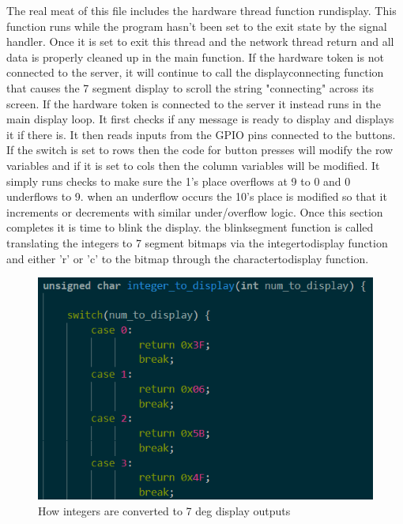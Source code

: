 \documentclass[a4paper,10pt]{article}
\begin{document}
The real meat of this file includes the hardware thread function run\textunderscore display. This function runs while the program hasn't been set to the exit state by the signal handler. Once it is set to exit this thread and the network thread return and all data is properly cleaned up in the main function. If the hardware token is not connected to the server, it will continue to call the display\textunderscore connecting function that causes the 7 segment display to scroll the string "connecting" across its screen. If the hardware token is connected to the server it instead runs in the main display loop. It first checks if any message is ready to display and displays it if there is. It then reads inputs from the GPIO pins connected to the buttons. If the switch is set to rows then the code for button presses will modify the row variables and if it is set to cols then the column variables will be modified. It simply runs checks to make sure the 1's place overflows at 9 to 0 and 0 underflows to 9. when an underflow occurs the 10's place is modified so that it increments or decrements with similar under/overflow logic. Once this section completes it is time to blink the display. the blink\textunderscore segment function is called translating the integers to 7 segment bitmaps via the integer\textunderscore to\textunderscore display function and either 'r' or 'c' to the bitmap through the character\textunderscore to\textunderscore display function.

\begin{figure}[H]
  \centering
      \includegraphics[width=\textwidth]{Assets/int_to_display.png}
  \caption{How integers are converted to 7 deg display outputs}
\end{figure}
\end{document}
